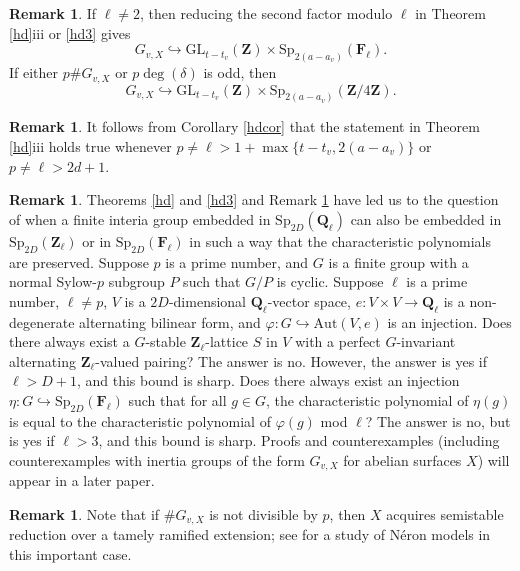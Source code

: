 \documentclass{amsart}
\def\Q{{\mathbf Q}}
\def\Z{{\mathbf Z}}
\def\F{{\mathbf F}}
\def\Aut{\mathrm{Aut}}
\def\GL{\mathrm{GL}}
\def\Sp{\mathrm{Sp}}
\theoremstyle{definition}
\newtheorem{rem}[thm]{Remark}
\begin{document}
\begin{rem}
\label{finrem}
If $\ell \ne 2$, 
then reducing the second factor modulo $\ell$
in Theorem \ref{hd}iii or \ref{hd3} gives  
$$G_{v,X} \hookrightarrow 
\GL_{t-t_{v}}(\Z) \times \Sp_{2(a-a_{v})}(\F_{\ell}).$$
If either $p\#G_{v,X}$
or $p \deg(\delta)$ is odd, then
$$G_{v,X} \hookrightarrow 
\GL_{t-t_{v}}(\Z) \times \Sp_{2(a-a_{v})}(\Z/4\Z).$$
\end{rem}

\begin{rem}
It follows from Corollary \ref{hdcor} that the statement
in Theorem \ref{hd}iii
holds true whenever $p \ne \ell > 1+\max\{t-t_v,2(a-a_v)\}$
or $p \ne \ell > 2d+1$.
\end{rem}

\begin{rem}
Theorems \ref{hd} and \ref{hd3} and 
Remark \ref{finrem} have led us to the
question of when a finite interia group embedded in 
$\Sp_{2D}(\Q_{\ell})$ can also be embedded in 
$\Sp_{2D}(\Z_{\ell})$ or in $\Sp_{2D}(\F_{\ell})$
in such a way that the characteristic polynomials are
preserved.
Suppose $p$ is a prime number, and $G$ is a finite group with
a normal Sylow-$p$ subgroup $P$ such that $G/P$ is cyclic.
Suppose $\ell$ is a prime number, $\ell \ne p$, $V$ is a
$2D$-dimensional $\Q_{\ell}$-vector space, $e: V \times V \to \Q_{\ell}$
is a non-degenerate alternating bilinear form, and
$\varphi: G \hookrightarrow \Aut(V,e)$ is an injection.
Does there always exist a $G$-stable $\Z_{\ell}$-lattice $S$ in $V$
with a perfect $G$-invariant alternating $\Z_{\ell}$-valued pairing?
The answer is no. However, the answer is yes if $\ell > D+1$,
and this bound is sharp. 
Does there always exist an injection 
$\eta: G \hookrightarrow \Sp_{2D}(\F_{\ell})$
such that for all $g \in G$, the characteristic polynomial of
$\eta(g)$ is equal to the characteristic polynomial of
$\varphi(g)$ mod $\ell$?
The answer is no, but is yes if $\ell > 3$,
and this bound is sharp. 
Proofs and counterexamples (including counterexamples
with inertia groups of the
form $G_{v,X}$ for abelian surfaces $X$)
will appear in a later paper.
\end{rem}

\begin{rem}
Note that if $\#G_{v,X}$ is not divisible by $p$,
then $X$ acquires semistable reduction over
a tamely ramified extension;  
see \cite{Edixhoven} for a study of N\'eron models in 
this important case.
\end{rem}
\end{document}
